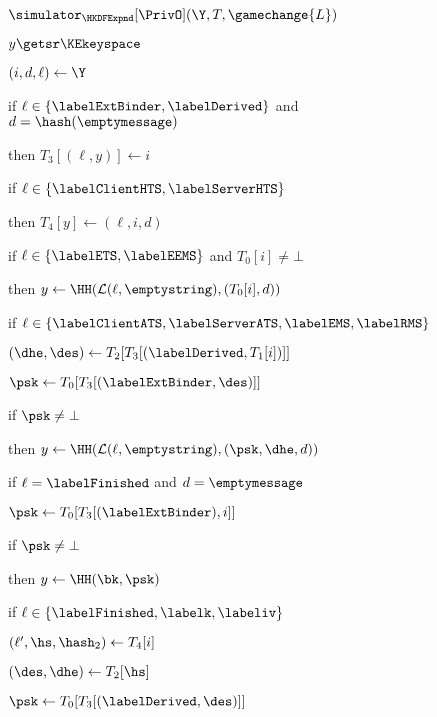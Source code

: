 \begin{figure}[tp]
\begin{minipage}[t]{0.49\textwidth}
\begin{oracle}{$\simulator_{\HKDFExpnd}[\PrivO](\Y, T, \gamechange{L})$}
				\item $y \getsr \KEkeyspace$
				\item {}
				\item {} 
				\item \quad {}
				\item {}
				\item $(i, d, \ell) \gets \Y$
				\item if $\ell \in \{\labelExtBinder, \labelDerived\}$ and $d = \hash(\emptymessage)$
				\item \quad then $T_{3}[(\ell,y)] \gets i$
				\item if $\ell \in \{\labelClientHTS, \labelServerHTS\}$
				\item \quad then $T_{4}[y] \gets (\ell, i, d)$
				\item	
				\item if $\ell \in \{\labelETS, \labelEEMS\}$ and $T_{0}[i] \neq \bot$
				\item \quad then $y \gets \HH(\mathcal{L}(\ell,\emptystring),(T_{0}[i], d))$
			\item
			\item if $\ell \in \{ \labelClientATS, \labelServerATS,\labelEMS, \labelRMS \}$
			\item \quad $(\dhe, \des) \gets T_2[T_3[(\labelDerived, T_1[i])]]$
			\item \quad $\psk \gets T_0[T_3[(\labelExtBinder, \des)]]$
			\item \quad if $\psk\neq \bot$
			\item \quad \quad then $y \gets \HH(\mathcal{L} (\ell,\emptystring), (\psk, \dhe, d))$ 
			\item
			\item if $\ell = \labelFinished$ and $d = \emptymessage$ 
			\item \quad $\psk \gets T_0[T_3[(\labelExtBinder), i]]$
			\item \quad if $\psk \neq \bot$ 
			\item \quad \quad then $y \gets \HH(\bk,\psk)$
			\item 
			\item if $\ell \in \{\labelFinished, \labelk, \labeliv \}$
			\item \quad $(\ell', \hs, \hash_2) \gets T_4[i]$
			\item \quad $(\des, \dhe) \gets T_2[\hs]$
			\item \quad $\psk \gets T_0[T_3[(\labelDerived, \des)]]$

\end{oracle}
\end{minipage}
\end{figure}
